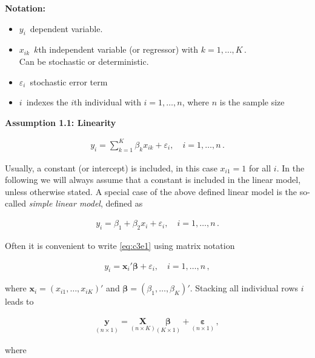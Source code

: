 \documentclass[]{book}
\theoremstyle{definition}
\theoremstyle{definition}
\theoremstyle{definition}
\theoremstyle{remark}
\begin{document}
\textbf{Notation:}

\begin{itemize}
\item
  \(y_i \,\) dependent variable.
\item
  \(x_{ik} \,\) \(k\)th independent variable (or regressor) with
  \(k=1,\dots,K \,\).\\
  Can be stochastic or deterministic.
\item
  \(\varepsilon_i \,\) stochastic error term
\item
  \(i \,\) indexes the \(i\)th individual with \(i=1,\dots,n\), where \(n\) is
  the sample size
\end{itemize}

\textbf{Assumption 1.1: Linearity}

\[
\begin{align*}
y_i = \sum_{k=1}^K\beta_k x_{ik}+\varepsilon_i, \quad i=1,\dots,n \,.
\label{eq:c3e1}
\end{align*}
\]

Usually, a constant (or intercept) is included, in this case \(x_{i1}=1\)
for all \(i\). In the following we will always assume that a constant is
included in the linear model, unless otherwise stated. A special case of
the above defined linear model is the so-called \emph{simple linear model},
defined as

\[
\begin{align*}
y_i = \beta_1+\beta_2 x_i +\varepsilon_i, \quad i=1,\dots,n \,.
\label{eq:c3e2}
\end{align*}
\]

Often it is convenient to write \eqref{eq:c3e1} using matrix notation

\[
\begin{align*}
y_i = \mathbf{x}_i'\boldsymbol{\beta} +\varepsilon_i, \quad i=1,\dots,n \,,
\label{eq:c3e3}
\end{align*}
\]

where \(\mathbf{x}_i=(x_{i1},\dots,x_{iK})'\) and
\(\boldsymbol{\beta}=(\beta_1,\dots,\beta_K)'\). Stacking all individual rows \(i\)
leads to

\[
\begin{align*}
\underset{(n\times 1)}{\mathbf{y}} = \underset{(n\times K)}{\mathbf{X}}\underset{(K\times 1)}{\boldsymbol{\beta}} + \underset{(n\times 1)}{\boldsymbol{\varepsilon}} \, ,
\end{align*}
\]

where
\end{document}
